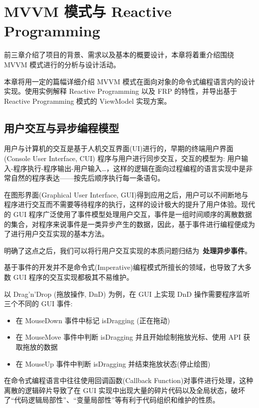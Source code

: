 \chapter{MVVM 模式与 Reactive Programming}

前三章介绍了项目的背景、需求以及基本的概要设计，本章将着重介绍围绕 MVVM 模式进行的分析与设计活动。

本章将用一定的篇幅详细介绍 MVVM 模式在面向对象的命令式编程语言内的设计实现。使用实例解释 Reactive Programming 以及 FRP 的特性，并导出基于 Reactive Programming 模式的 ViewModel 实现方案。

\section{用户交互与异步编程模型}

用户与计算机的交互是基于人机交互界面(UI)进行的，早期的终端用户界面 (Console User Interface, CUI) 程序与用户进行同步交互，交互的模型为: 用户输入-程序执行-程序输出-用户输入\ldots，这样的逻辑在面向过程编程的语言实现中是非常自然的程序表达——按先后顺序执行每一条语句。

在图形界面(Graphical User Interface, GUI)得到应用之后，用户可以不间断地与程序进行交互而不需要等待程序的执行，这样的设计极大的提升了用户体验。现代的 GUI 程序广泛使用了事件模型处理用户交互，事件是一组时间顺序的离散数据的集合，对程序来说事件是一类异步产生的数据，因此，基于事件进行编程便成为了进行用户交互实现的基本方法。

明确了这点之后，我们可以将行用户交互实现的本质问题归结为~\textbf{处理异步事件}。

基于事件的开发并不是命令式(Imperative)编程模式所擅长的领域，也导致了大多数 GUI 程序的交互实现都极其不易维护。

以 Drag'n'Drop (拖放操作, DnD) 为例\cite{Zhao2010}，在 GUI 上实现 DnD 操作需要程序监听三个不同的 GUI 事件:

\begin{itemize}
  \item 在 MouseDown 事件中标记 isDragging (正在拖动)
  \item 在 MouseMove 事件中判断 isDragging 并且开始绘制拖放光标、使用 API 获取拖放的数据
  \item 在 MouseUp 事件中判断 isDragging 并结束拖放状态(停止绘图)
\end{itemize}

在命令式编程语言中往往使用回调函数(Callback Function)对事件进行处理，这种离散的逻辑碎片导致了在 GUI 实现中出现大量的碎片代码以及全局状态，破坏了“代码逻辑局部性”、“变量局部性”等有利于代码组织和维护的性质。

